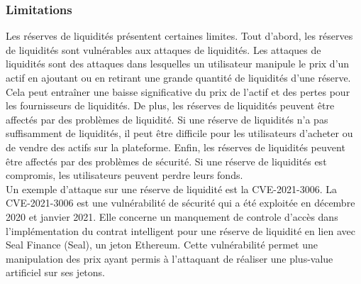 \subsubsection{Limitations}
Les réserves de liquidités présentent certaines limites. Tout d’abord, les réserves de liquidités sont vulnérables aux attaques de liquidités. Les attaques de liquidités sont des attaques dans lesquelles un utilisateur manipule le prix d’un actif en ajoutant ou en retirant une grande quantité de liquidités d’une réserve. Cela peut entraîner une baisse significative du prix de l’actif et des pertes pour les fournisseurs de liquidités. De plus, les réserves de liquidités peuvent être affectés par des problèmes de liquidité. Si une réserve de liquidités n’a pas suffisamment de liquidités, il peut être difficile pour les utilisateurs d’acheter ou de vendre des actifs sur la plateforme. Enfin, les réserves de liquidités peuvent être affectés par des problèmes de sécurité. Si une réserve de liquidités est compromis, les utilisateurs peuvent perdre leurs fonds. \\
Un exemple d'attaque sur une réserve de liquidité est la CVE-2021-3006. La CVE-2021-3006 est une vulnérabilité de sécurité qui a été exploitée en décembre 2020 et janvier 2021. Elle concerne un manquement de controle d'accès dans l’implémentation du contrat intelligent pour une réserve de liquidité en lien avec Seal Finance (Seal), un jeton Ethereum. Cette vulnérabilité permet une manipulation des prix ayant permis à l'attaquant de réaliser une plus-value artificiel sur ses jetons.
